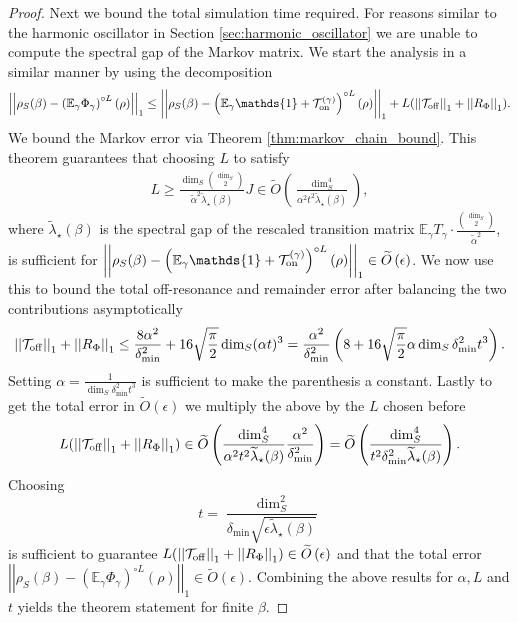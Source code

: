 \documentclass[
 amsmath,amssymb,
 aps,
onecolumn, 
nofootinbib]{revtex4-2}
\newcommand{\on}{\rm on}
\newcommand{\off}{\rm off}
\newcommand{\norm}[1]{\left|\left| #1 \right|\right|}
\newcommand{\EE}{\mathbb{E}}
\newcommand{\TT}{\mathcal{T}}
\newcommand{\bigotilde}[1]{\widetilde{O} \left( #1 \right)}
\newcommand{\identity}{\mathds{1}}
\begin{document}
\begin{proof}
Next we bound the total simulation time required. For reasons similar to the harmonic oscillator in Section \ref{sec:harmonic_oscillator} we are unable to compute the spectral gap of the Markov matrix. We start the analysis in a similar manner by using the decomposition
\begin{equation}
    \norm{\rho_S(\beta) - \left(\EE_\gamma \Phi_\gamma\right)^{\circ L}(\rho)}_1 \le \norm{\rho_S(\beta) - \left(\EE_\gamma \identity + \TT_{\on}^{(\gamma)}\right)^{\circ L}(\rho)}_1 + L(\norm{\TT_{\off}}_1 + \norm{R_{\Phi}}_1 ).
\end{equation}
We bound the Markov error via Theorem \ref{thm:markov_chain_bound}. This theorem guarantees that choosing $L$ to satisfy
\begin{align}
    L \ge \frac{\dim_S \binom{\dim_S}{2}}{\widetilde{\alpha}^2 \widetilde{\lambda}_\star(\beta)} J \in \bigotilde{\frac{\dim_S^4}{\alpha^2 t^2 \widetilde{\lambda}_\star(\beta)}},
\end{align}
where $\widetilde{\lambda}_\star(\beta)$ is the spectral gap of the rescaled transition matrix $\EE_\gamma T_\gamma \cdot \frac{\binom{\dim_S}{2}}{\widetilde{\alpha}^2}$, is sufficient for $\norm{\rho_S(\beta) - \left(\EE_\gamma \identity + \TT_{\on}^{(\gamma)}\right)^{\circ L}(\rho)}_1 \in \bigotilde{\epsilon}$. We now use this to bound the total off-resonance and remainder error after balancing the two contributions asymptotically
\begin{align}
    \norm{\TT_{\off}}_1 + \norm{R_{\Phi}}_1 \le \frac{8\alpha^2}{\delta_{\min}^2} + 16 \sqrt{\frac{\pi}{2}} \dim_S (\alpha t)^3 = \frac{\alpha^2}{\delta_{\min}^2} \left( 8+ 16 \sqrt{\frac{\pi}{2}}  \alpha \dim_S \delta_{\min}^2 t^3\right).
\end{align}
Setting $\alpha = \frac{1}{\dim_S \delta_{\min}^2 t^3}$ is sufficient to make the parenthesis a constant. Lastly to get the total error in $\bigotilde{\epsilon}$ we multiply the above by the $L$ chosen before
\begin{align}
    L (\norm{\TT_{\off}}_1 + \norm{R_{\Phi}}_1) \in \bigotilde{\frac{\dim_S^4}{\alpha^2 t^2 \widetilde{\lambda}_\star(\beta)} \frac{\alpha^2}{\delta_{\min}^2}} = \bigotilde{\frac{\dim_S^4}{ t^2 \delta_{\min}^2 \widetilde{\lambda}_\star(\beta)} }.
\end{align}
Choosing
\begin{equation}
    t = \frac{\dim_S^2}{\delta_{\min} \sqrt{\epsilon \widetilde{\lambda}_\star(\beta)}} 
\end{equation}
is sufficient to guarantee $L (\norm{\TT_{\off}}_1 + \norm{R_{\Phi}}_1) \in \bigotilde{\epsilon}$ and that the total error $\norm{\rho_S(\beta) - \left( \EE_\gamma \Phi_\gamma \right)^{\circ L}(\rho)}_1 \in \bigotilde{\epsilon}$. Combining the above results for $\alpha, L$ and $t$ yields the theorem statement for finite $\beta$. 


\end{proof}
\end{document}
